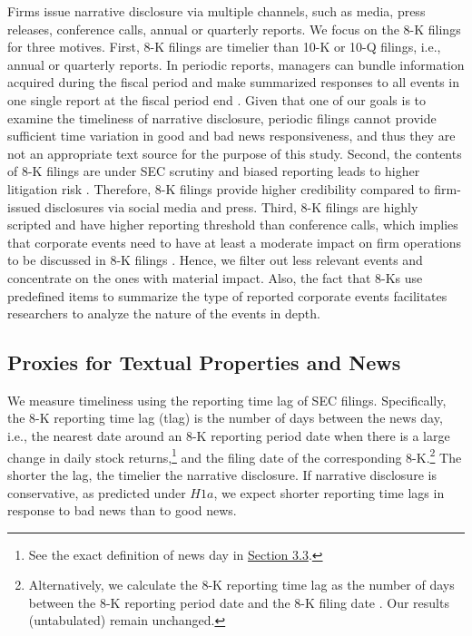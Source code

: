 \documentclass[letterpaper,12pt]{article}
\begin{document}
\begin{spacing}{1.5}
Firms issue narrative disclosure via multiple channels, such as media, press releases, conference calls, annual or quarterly reports. We focus on the 8-K filings for three motives. First, 8-K filings are timelier than 10-K or 10-Q filings, i.e., annual or quarterly reports. In periodic reports, managers can bundle information acquired during the fiscal period and make summarized responses to all events in one single report at the fiscal period end \cite{segalAreManagersStrategic2016}. Given that one of our goals is to examine the timeliness of narrative disclosure, periodic filings cannot provide sufficient time variation in good and bad news responsiveness, and thus they are not an appropriate text source for the purpose of this study. Second, the contents of 8-K filings are under SEC scrutiny and biased reporting leads to higher litigation risk \cite{rogersDisclosureToneShareholder2011}. Therefore, 8-K filings provide higher credibility compared to firm-issued disclosures via social media and press. Third, 8-K filings are highly scripted and have higher reporting threshold than conference calls, which implies that corporate events need to have at least a moderate impact on firm operations to be discussed in 8-K filings \cite{hassanFirmLevelPoliticalRisk2019}. Hence, we filter out less relevant events and concentrate on the ones with material impact. Also, the fact that 8-Ks use predefined items to summarize the type of reported corporate events facilitates researchers to analyze the nature of the events in depth.

\subsection{Proxies for Textual Properties and News} \label{sec3.2}
\noindent We measure timeliness using the reporting time lag of SEC filings. Specifically, the 8-K reporting time lag (tlag) is the number of days between the news day, i.e., the nearest date around an 8-K reporting period date when there is a large change in daily stock returns,\footnote{See the exact definition of news day in \hyperref[sec3.3]{Section 3.3}.} and the filing date of the corresponding 8-K.\footnote{Alternatively, we calculate the 8-K reporting time lag as the number of days between the 8-K reporting period date and the 8-K filing date \cite{carterRelevanceForm8K1999, niessnerStrategicDisclosureTiming2015, chapmanInformationOverloadDisclosure2019}. Our results (untabulated) remain unchanged.} The shorter the lag, the timelier the narrative disclosure. If narrative disclosure is conservative, as predicted under $H1a$, we expect shorter reporting time lags in response to bad news than to good news.


\end{spacing}
\end{document}

